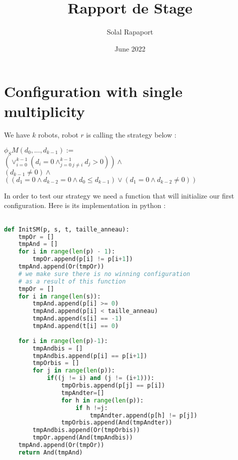 \documentclass{article}
\title{Rapport de Stage}
\author{Solal Rapaport }
\date{June 2022}
\begin{document}
\maketitle

\section{Configuration with single multiplicity}

We have $k$ robots, robot $r$ is calling the strategy below :
\begin{center}
$\phi_SM(d_0, ..., d_{k-1}):=$\\
$(\lor_{i=0}^{k-1}(d_i = 0\land_{j=0\ j\not=i}^{k-1} d_j > 0))\land$\\
$(d_{k-1} \not= 0) \land $\\
$((d_1 = 0 \land d_{k-2} = 0 \land d_0 \leq d_{k-1}) \lor (d_1 = 0 \land d_{k-2} \not= 0))$
\end{center}

In order to test our strategy we need a function that will initialize our first configuration. Here is its implementation in python :

\begin{lstlisting}[language=Python]

def InitSM(p, s, t, taille_anneau):
    tmpOr = []
    tmpAnd = []
    for i in range(len(p) - 1):
        tmpOr.append(p[i] != p[i+1])
    tmpAnd.append(Or(tmpOr))
    # we make sure there is no winning configuration
    # as a result of this function
    tmpOr = []
    for i in range(len(s)):
        tmpAnd.append(p[i] >= 0)
        tmpAnd.append(p[i] < taille_anneau)
        tmpAnd.append(s[i] == -1)
        tmpAnd.append(t[i] == 0)
    
    for i in range(len(p)-1):
        tmpAndbis = []
        tmpAndbis.append(p[i] == p[i+1])
        tmpOrbis = []
        for j in range(len(p)):
            if((j != i) and (j != (i+1))):
                tmpOrbis.append(p[j] == p[i])
                tmpAndter=[]
                for h in range(len(p)):
                    if h !=j:
                        tmpAndter.append(p[h] != p[j])
                tmpOrbis.append(And(tmpAndter))
        tmpAndbis.append(Or(tmpOrbis))
        tmpOr.append(And(tmpAndbis))
    tmpAnd.append(Or(tmpOr))
    return And(tmpAnd)
\end{lstlisting}
\end{document}
